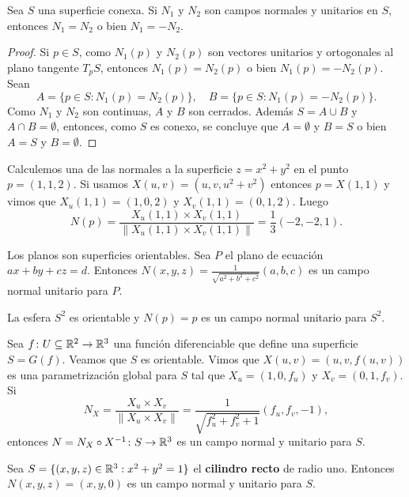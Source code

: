 \begin{lemma}
	Sea $S$ una superficie conexa. Si $N_1$ y $N_2$ son campos normales y
	unitarios en $S$, entonces $N_1=N_2$ o bien $N_1=-N_2$.
\end{lemma}

\begin{proof}
	Si $p\in S$, como $N_1(p)$ y $N_2(p)$ son vectores unitarios y ortogonales
	al plano tangente $T_pS$, entonces $N_1(p)=N_2(p)$ o bien $N_1(p)=-N_2(p)$.
	Sean 
	\[
		A=\{p\in S:N_1(p)=N_2(p)\},\quad
		B=\{p\in S:N_1(p)=-N_2(p)\}.
	\]
	Como $N_1$ y $N_2$ son continuas, $A$
	y $B$ son cerrados. Además $S=A\cup B$ y $A\cap B=\emptyset$, entonces,
	como $S$ es conexo, se concluye que $A=\emptyset$ y $B=S$ o bien $A=S$ y
	$B=\emptyset$.
\end{proof}

\begin{example}
	Calculemos una de las normales a la superficie $z=x^2+y^2$ en el punto
	$p=(1,1,2)$. Si usamos $X(u,v)=(u,v,u^2+v^2)$ entonces $p=X(1,1)$ y vimos
	que
	$X_u(1,1)=(1,0,2)$ y 
	$X_v(1,1)=(0,1,2)$. 
	Luego 
	\[
		N(p)=\frac{X_u(1,1)\times X_v(1,1)}{\|X_u(1,1)\times X_v(1,1)\|}=\frac13(-2,-2,1).
	\]
\end{example}

\begin{example}
	Los planos son superficies orientables. Sea $P$ el plano de ecuación
	$ax+by+cz=d$. Entonces $N(x,y,z)=\frac{1}{\sqrt{a^2+b^2+c^2}}(a,b,c)$ es un
	campo normal unitario para $P$. 
\end{example}

\begin{example}
	La esfera $S^2$ es orientable y $N(p)=p$ es un campo normal unitario
	para $S^2$. 
\end{example}

\begin{example}
	Sea $f\colon U\subseteq\mathbb{R}^2\to\mathbb{R}^3$ una función diferenciable que define una superficie
	$S=G(f)$. Veamos que $S$ es orientable. Vimos que 
	$X(u,v)=(u,v,f(u,v))$ es una parametrización global para $S$ tal que 
	$X_u=(1,0,f_u)$ y $X_v=(0,1,f_v)$. Si 
	\[
		N_X=\frac{X_u\times X_v}{\|X_u\times X_v\|}=\frac{1}{\sqrt{f_u^2+f_v^2+1}}(f_u,f_v,-1),
	\]
	entonces $N=N_X\circ X^{-1}\colon S\to\mathbb{R}^3$ 
	es un campo normal y unitario para $S$.
\end{example}

\begin{example}
	Sea $S=\{(x,y,z)\in\mathbb{R}^3:x^2+y^2=1\}$ el \textbf{cilindro recto} de radio uno.
	Entonces $N(x,y,z)=(x,y,0)$ es un campo normal y
	unitario para $S$.
\end{example}


